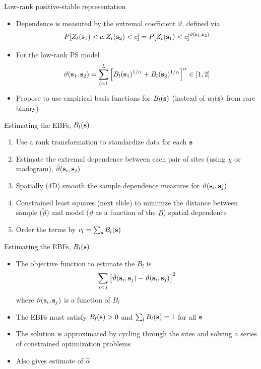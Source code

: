 \documentclass{beamer}
\begin{document}
\begin{frame}{Low-rank positive-stable representation}
  \begin{itemize}\setlength{\itemsep}{1em}
    \item Dependence is measured by the extremal coefficient $\vartheta$, defined via $$P[Z_t(\mathbf{s}_1)<c, Z_t(\mathbf{s}_2)<c] = P[Z_t(\mathbf{s}_1)<c]^{\vartheta(\mathbf{s}_1,\mathbf{s}_2)}$$
    \item For the low-rank PS model $$\vartheta(\mathbf{s}_1,\mathbf{s}_2) = \sum_{l=1}^L\left[B_l(\mathbf{s}_1)^{1/\alpha}+B_l(\mathbf{s}_2)^{1/\alpha}\right]^{\alpha}\in[1,2] $$
    \item Propose to use empirical basis functions for $B_l(\mathbf{s})$ (instead of $w_l(\mathbf{s})$ from rare binary)
  \end{itemize}
\end{frame}

\begin{frame}{Estimating the EBFs, $B_l(\mathbf{s})$}
	\begin{enumerate}[1.]\setlength\itemsep{1em}
		\item Use a rank transformation to standardize data for each $\mathbf{s}$
		\item Estimate the extremal dependence between each pair of sites (using $\chi$ or madogram), ${\hat \vartheta}(\mathbf{s}_i,\mathbf{s}_j)$
		\item Spatially (4D) smooth the sample dependence measures for $\tilde{\vartheta}(\mathbf{s}_i, \mathbf{s}_j)$
		\item Constrained least squares (next slide) to minimize the distance between sample ($\tilde{\vartheta}$) and model ($\vartheta$ as a function of the $B$) spatial dependence
		\item Order the terms by $v_l = \sum_{\mathbf{s}}B_l(\mathbf{s})$
	\end{enumerate}
\end{frame}


\begin{frame}{Estimating the EBFs, $B_l(\mathbf{s})$}
	\begin{itemize}\setlength\itemsep{1em}
		\item The objective function to estimate the $B_l$ is
		$$ \sum_{i<j}\left[\tilde{\vartheta}(\mathbf{s}_i,\mathbf{s}_j) - \vartheta(\mathbf{s}_i,\mathbf{s}_j)\right]^2$$
		where $\vartheta(\mathbf{s}_i,\mathbf{s}_j)$ is a function of $B_l$
		\item The EBFs must satisfy $B_l(\mathbf{s})>0$ and $\sum_{l}B_l(\mathbf{s})=1$ for all $\mathbf{s}$
		\item The solution is approximated by cycling through the sites and solving a series of constrained optimization problems
    \item Also gives estimate of $\hat{\alpha}$
	\end{itemize}
\end{frame}
\end{document}
